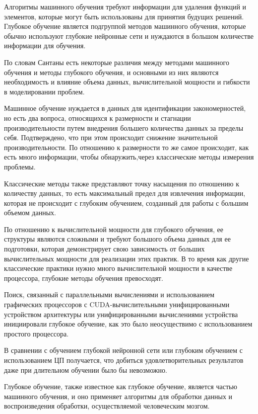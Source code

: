  Алгоритмы машинного обучения требуют информации для удаления функций и элементов, 
 которые могут быть использованы для принятия будущих решений. 
 Глубокое обучение является подгруппой методов машинного обучения,
 которые обычно используют глубокие нейронные сети и нуждаются в большом количестве информации для обучения. 

 По словам Сантаны есть некоторые различия между методами машинного обучения и методы глубокого обучения, 
 и основными из них являются необходимость и влияние объема данных, 
 вычислительной мощности и гибкости в моделировании проблем.

 Машинное обучение нуждается в данных для идентификации закономерностей, но есть два вопроса, 
 относящихся к размерности и стагнации производительности путем внедрения большего количества данных за пределы себя. 
 Подтверждено, что при этом происходит снижение значительной производительности. 
 По отношению к размерности то же самое происходит, как есть много информации, 
 чтобы обнаружить,через классические методы измерения проблемы. 

 Классические методы также представляют точку насыщения по отношению к количеству данных,
 то есть максимальный предел для извлечения информации, которая не происходит с глубоким обучением,
 созданный для работы с большим объемом данных.

 По отношению к вычислительной мощности для глубокого обучения, 
 ее структуры являются сложными и требуют большого объема данных для ее подготовки, 
 которая демонстрирует свою зависимость от больших вычислительных мощности для реализации этих практик. 
 В то время как другие классические практики нужно много вычислительной мощности в качестве процессора, 
 глубокие методы обучения превосходят. 

 Поиск, связанный с параллельными вычислениями и использованием графических процессоров с CUDA-вычислительными
 унифицированными устройством архитектуры или унифицированными вычислениями устройства инициировали глубокое обучение, 
 как это было неосуществимо с использованием простого процессора. 

 В сравнении с обучением глубокой нейронной сети или глубоким обучением с использованием ЦП получается, 
 что добиться удовлетворительных результатов даже при длительном обучении было бы невозможно.

 Глубокое обучение, также известное как глубокое обучение, является частью машинного обучения,
 и оно применяет алгоритмы для обработки данных и воспроизведения обработки, 
 осуществляемой человеческим мозгом.

